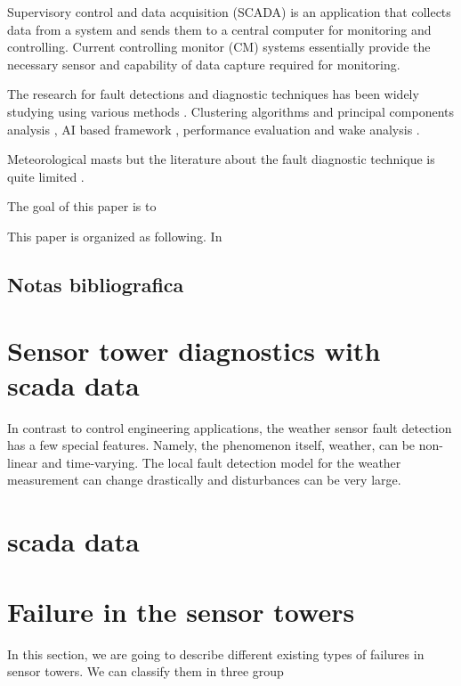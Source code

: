 \documentclass[journal]{IEEEtran}
\begin{document}
Supervisory control and data acquisition (SCADA) is an application that collects data from a system and sends them to a central computer for monitoring and controlling. Current controlling monitor (CM) systems essentially provide the necessary sensor and capability of data capture required for monitoring.

The research for  fault detections and diagnostic techniques has been widely studying using various methods \cite{tchakoua2014wind,wymore2015survey}. 
Clustering algorithms and principal components analysis \cite{kim2011use}, AI based framework \cite{wang2014scada}, performance evaluation and wake analysis \cite{astolfi2016mathematical}.

Meteorological masts  
but the literature about the fault diagnostic technique is quite limited \cite{hasu2006weather} .


The goal of this paper is to


This paper is organized as following. In


\subsection{Notas bibliografica}



\cite{kusiak2011prediction}

\cite{lu2009review}

\cite{schlechtingen2012condition}

\cite{schlechtingen2011comparative}

\cite{yang2014wind}




\section{Sensor tower diagnostics with scada data}
In contrast to control engineering applications, the weather sensor fault detection has a few special features. Namely, the phenomenon itself, weather, can be non-linear and time-varying. The local fault detection model for the weather measurement can change drastically and disturbances can be very large.

\section{scada data}\label{sec:scadaData}
\section{Failure in the sensor towers}\label{sec:failures}
In this section, we are going to describe different existing types of failures in sensor towers. We can classify them in three group
\end{document}
